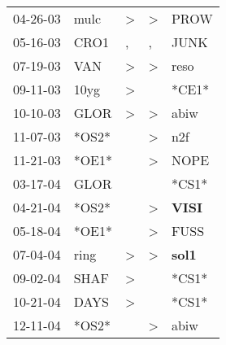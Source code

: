 \begin{supertabular}{p{0.07\textwidth}p{0.06\textwidth}p{0.02\textwidth}p{0.02\textwidth}p{0.06\textwidth}}
          04-26-03\textsuperscript{} &           mulc\textsuperscript{} &     \textgreater &     \textgreater &           PROW\textsuperscript{} \\
          05-16-03\textsuperscript{} &           CRO1\textsuperscript{} &                , &                , &           JUNK\textsuperscript{} \\
          07-19-03\textsuperscript{} &            VAN\textsuperscript{} &     \textgreater &     \textgreater &           reso\textsuperscript{} \\
          09-11-03\textsuperscript{} &           10yg\textsuperscript{} &     \textgreater &                  &                            *CE1* \\
          10-10-03\textsuperscript{} &           GLOR\textsuperscript{} &     \textgreater &     \textgreater &           abiw\textsuperscript{} \\
          11-07-03\textsuperscript{} &                            *OS2* &                  &     \textgreater &            n2f\textsuperscript{} \\
          11-21-03\textsuperscript{} &                            *OE1* &                  &     \textgreater &           NOPE\textsuperscript{} \\
          03-17-04\textsuperscript{} &           GLOR\textsuperscript{} &                  &                  &                            *CS1* \\
          04-21-04\textsuperscript{} &                            *OS2* &                  &     \textgreater &  \textbf{VISI\textsuperscript{}} \\
          05-18-04\textsuperscript{} &                            *OE1* &                  &     \textgreater &           FUSS\textsuperscript{} \\
          07-04-04\textsuperscript{} &           ring\textsuperscript{} &     \textgreater &     \textgreater &  \textbf{sol1\textsuperscript{}} \\
          09-02-04\textsuperscript{} &           SHAF\textsuperscript{} &     \textgreater &                  &                            *CS1* \\
          10-21-04\textsuperscript{} &           DAYS\textsuperscript{} &     \textgreater &                  &                            *CS1* \\
          12-11-04\textsuperscript{} &                            *OS2* &                  &     \textgreater &           abiw\textsuperscript{} \\

\end{supertabular}
